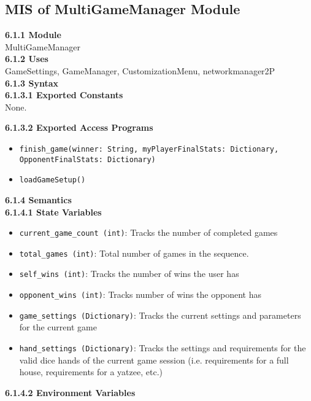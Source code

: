 \documentclass[12pt, titlepage]{article}
\begin{document}
\subsection{MIS of MultiGameManager Module}\label{MultiGameManager}
\textbf{6.1.1 Module}\\
\noindent MultiGameManager \\

\noindent \textbf{6.1.2 Uses}\\

GameSettings, GameManager, CustomizationMenu, networkmanager2P\\


\noindent \textbf{6.1.3 Syntax}\\
\textbf{6.1.3.1 Exported Constants}\\
None.  

\noindent \textbf{6.1.3.2 Exported Access Programs}
\begin{itemize}
    \item \texttt{finish\_game(winner: String, myPlayerFinalStats: Dictionary, OpponentFinalStats: Dictionary)}
    \item \texttt{loadGameSetup()}
\end{itemize}

\textbf{6.1.4 Semantics}\\
\textbf{6.1.4.1 State Variables}\\
\begin{itemize}
    \item \texttt{current\_game\_count (int)}: Tracks the number of completed games
    \item \texttt{total\_games (int)}: Total number of games in the sequence.
    \item \texttt{self\_wins (int)}: Tracks the number of wins the user has 
    \item \texttt{opponent\_wins (int)}: Tracks number of wins the opponent has
    \item \texttt{game\_settings (Dictionary)}: Tracks the current settings and parameters for the current game
    \item \texttt{hand\_settings (Dictionary)}: Tracks the settings and requirements for the valid dice hands of the current game session (i.e. requirements for a full house, requirements for a yatzee, etc.)

\end{itemize}

\textbf{6.1.4.2 Environment Variables}\\
\end{document}
